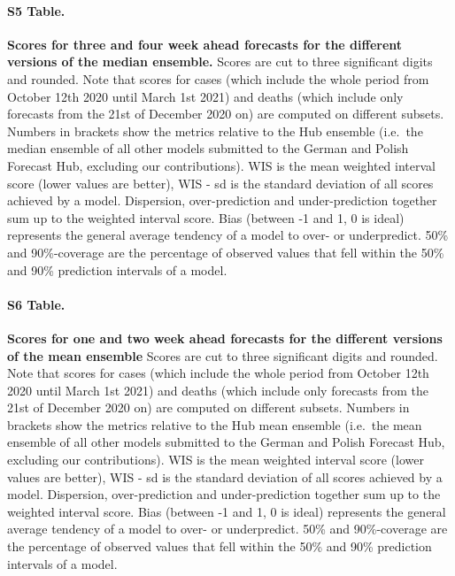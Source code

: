 \documentclass[10pt,letterpaper]{article}
\begin{document}
\paragraph{S5 Table.}
\label{tab:score-table-ensemble-4}

\textbf{Scores for three and four week ahead forecasts for the different versions of the median ensemble.}
Scores are cut to three significant digits and rounded. Note that scores
for cases (which include the whole period from October 12th 2020 until
March 1st 2021) and deaths (which include only forecasts from the 21st
of December 2020 on) are computed on different subsets. Numbers in
brackets show the metrics relative to the Hub ensemble (i.e.~the median
ensemble of all other models submitted to the German and Polish Forecast
Hub, excluding our contributions). WIS is the mean weighted interval
score (lower values are better), WIS - sd is the standard deviation of
all scores achieved by a model. Dispersion, over-prediction and
under-prediction together sum up to the weighted interval score. Bias
(between -1 and 1, 0 is ideal) represents the general average tendency
of a model to over- or underpredict. 50\% and 90\%-coverage are the
percentage of observed values that fell within the 50\% and 90\%
prediction intervals of a model.

\paragraph{S6 Table.}
\label{tab:score-table-ensemble-mean-2}

\textbf{Scores for one and two week ahead forecasts for the different versions of the mean ensemble}
Scores are cut to three significant digits and rounded. Note that scores
for cases (which include the whole period from October 12th 2020 until
March 1st 2021) and deaths (which include only forecasts from the 21st
of December 2020 on) are computed on different subsets. Numbers in
brackets show the metrics relative to the Hub mean ensemble (i.e.~the
mean ensemble of all other models submitted to the German and Polish
Forecast Hub, excluding our contributions). WIS is the mean weighted
interval score (lower values are better), WIS - sd is the standard
deviation of all scores achieved by a model. Dispersion, over-prediction
and under-prediction together sum up to the weighted interval score.
Bias (between -1 and 1, 0 is ideal) represents the general average
tendency of a model to over- or underpredict. 50\% and 90\%-coverage are
the percentage of observed values that fell within the 50\% and 90\%
prediction intervals of a model.
\end{document}
